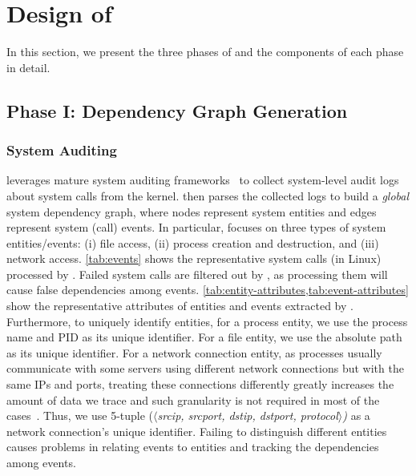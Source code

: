 \section{Design of \tool}
\label{sec:approach}

In this section, we present the three phases of \tool and the components of each phase in detail.




\subsection{Phase I: Dependency Graph Generation}
\label{subsec:phase1}

\subsubsection{System Auditing}
\label{subsubsec:system-auditing}

\tool leverages mature system auditing frameworks~\cite{auditd,etw,dtrace,sysdig} to collect
system-level audit logs about system calls from the kernel. 
\tool then parses the collected logs to build a \emph{global} system dependency graph, where nodes represent system entities and edges represent system (call) events. 
In particular, \tool focuses on three types of system entities/events: 
(i) file access, 
(ii) process creation and destruction, and
(iii) network access.
%
\cref{tab:events} shows the representative system calls (in Linux) processed by \tool.
Failed system calls are filtered out by \tool, as processing them will cause false dependencies among events.
\cref{tab:entity-attributes,tab:event-attributes} show the representative attributes of entities and events extracted by \tool.
%
Furthermore, to uniquely identify entities,
for a process entity, we use the process name and PID as its unique identifier.
For a file entity, we use the absolute path as its unique identifier. 
For a network 
connection entity, as processes usually communicate with some servers using different network connections but with the same IPs and ports, treating these connections differently greatly increases the amount of data we trace and such granularity is not required in most of the cases~\cite{liu2018priotracker,gao2018aiql,gao2018saql}. Thus, we use 5-tuple (\emph{$\langle$srcip, srcport, dstip, dstport, protocol$\rangle$)} as a network 
connection's
unique identifier. 
Failing to distinguish different entities causes problems in relating events to entities and tracking the dependencies among events.





